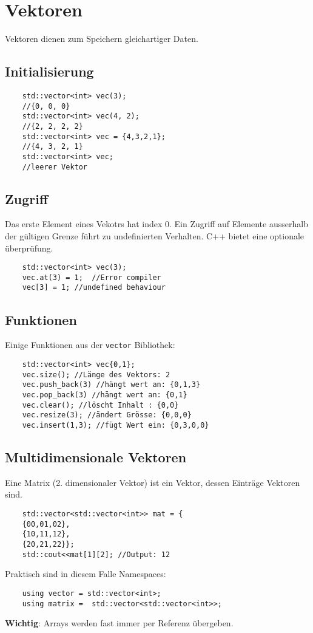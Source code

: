 \section{Vektoren} 
Vektoren dienen zum Speichern gleichartiger Daten.
\subsection{Initialisierung}
\begin{lstlisting}
	std::vector<int> vec(3);
	//{0, 0, 0}
	std::vector<int> vec(4, 2);
	//{2, 2, 2, 2}
	std::vector<int> vec = {4,3,2,1};
	//{4, 3, 2, 1}
	std::vector<int> vec;
	//leerer Vektor
\end{lstlisting}
\subsection{Zugriff}
Das erste Element eines Vekotrs hat index 0. Ein Zugriff auf Elemente ausserhalb der gültigen Grenze führt zu undefinierten Verhalten. C++ bietet eine optionale überprüfung.
\begin{lstlisting}
	std::vector<int> vec(3);
	vec.at(3) = 1;	//Error compiler
	vec[3] = 1; //undefined behaviour
\end{lstlisting}
\subsection{Funktionen}
Einige Funktionen aus der \texttt{vector} Bibliothek:
\begin{lstlisting}
	std::vector<int> vec{0,1};
	vec.size(); //Länge des Vektors: 2
	vec.push_back(3) //hängt wert an: {0,1,3}
	vec.pop_back(3) //hängt wert an: {0,1}
	vec.clear(); //löscht Inhalt : {0,0}
	vec.resize(3); //ändert Grösse: {0,0,0}
	vec.insert(1,3); //fügt Wert ein: {0,3,0,0}
\end{lstlisting}
\subsection{Multidimensionale Vektoren}
Eine Matrix (2. dimensionaler Vektor) ist ein Vektor, dessen Einträge Vektoren sind.
\begin{lstlisting}
	std::vector<std::vector<int>> mat = {
	{00,01,02},
	{10,11,12},
	{20,21,22}};
	std::cout<<mat[1][2]; //Output: 12
\end{lstlisting}
Praktisch sind in diesem Falle Namespaces:
\vspace{-11pt}
\begin{lstlisting}
	using vector = std::vector<int>;
	using matrix = 	std::vector<std::vector<int>>;
\end{lstlisting}
\textbf{Wichtig}: Arrays werden fast immer per Referenz übergeben.




